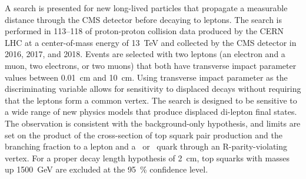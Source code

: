 
A search is presented for new long-lived particles that propagate a measurable distance through the CMS detector before decaying to leptons. The search is performed in 113--\SI{118}{\invfb} of proton-proton collision data produced by the CERN LHC at a center-of-mass energy of \SI{13}{\TeV} and collected by the CMS detector in 2016, 2017, and 2018. Events are selected with two leptons (an electron and a muon, two electrons, or two muons) that both have transverse impact parameter values between \SI{0.01}{\cm} and \SI{10}{\cm}. Using transverse impact parameter as the discriminating variable allows for sensitivity to displaced decays without requiring that the leptons form a common vertex. The search is designed to be sensitive to a wide range of new physics models that produce displaced di-lepton final states. The observation is consistent with the background-only hypothesis, and limits are set on the product of the cross-section of top squark pair production and the branching fraction to a lepton and a \cPqb\ or \cPqd\ quark through an R-parity-violating vertex. For a proper decay length hypothesis of \SI{2}{\cm}, top squarks with masses up \SI{1500}{\GeV} are excluded at the \SI{95}{\percent} confidence level.

